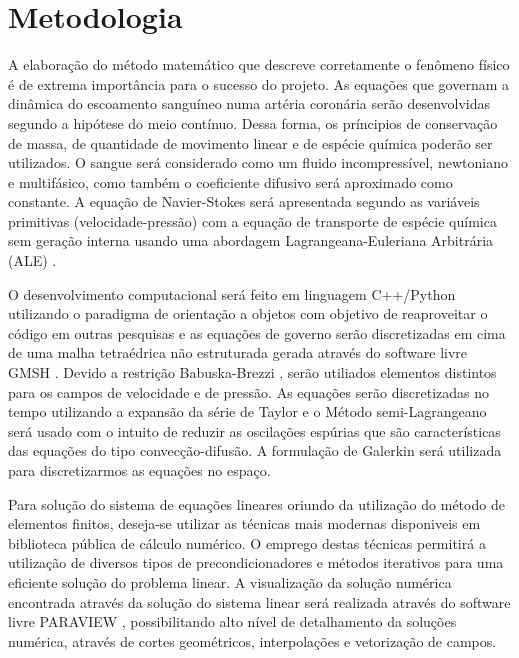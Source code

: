 \section{Metodologia}

A elaboração do método matemático que descreve corretamente o fenômeno físico é de extrema importância para o sucesso do projeto. 
As equações que governam a dinâmica do escoamento sanguíneo numa artéria coronária serão desenvolvidas segundo a hipótese do meio contínuo. 
Dessa forma, os príncipios de conservação de massa, de quantidade de movimento linear e de espécie química poderão ser utilizados. 
O sangue será considerado como um fluido incompressível, newtoniano e multifásico, 
como também o coeficiente difusivo será aproximado como constante. 
A equação de Navier-Stokes será apresentada segundo as variáveis primitivas (velocidade-pressão) com 
a equação de transporte de espécie química sem geração interna
usando uma abordagem Lagrangeana-Euleriana Arbitrária (ALE) \cite{donea}.

\medskip
O desenvolvimento computacional será feito em linguagem C++/Python \cite{c++} \cite{python} 
utilizando o paradigma de orientação a objetos com objetivo de reaproveitar o código em outras pesquisas e 
as equações de governo serão discretizadas em cima de uma malha tetraédrica não estruturada gerada através do software livre GMSH \cite{gmsh}. 
Devido a restrição Babuska-Brezzi \cite{babuska} \cite{brezzi}, serão utiliados elementos distintos para os campos de velocidade e de pressão. 
As equações serão discretizadas no tempo utilizando a expansão da série de Taylor e o Método semi-Lagrangeano \cite{pironneu} será usado com o intuito de reduzir as oscilações espúrias que são características das equações do tipo convecção-difusão.
A formulação de Galerkin \cite{galerkin} será utilizada para discretizarmos as equações no espaço. 

\medskip
Para solução do sistema de equações lineares oriundo da utilização do método de elementos finitos, 
deseja-se utilizar as técnicas mais modernas disponiveis em biblioteca pública de cálculo numérico. 
O emprego destas técnicas permitirá a utilização de diversos tipos de precondicionadores e 
métodos iterativos para uma eficiente solução do problema linear. 
A visualização da solução numérica encontrada através da solução do sistema linear será realizada através do software livre PARAVIEW \cite{paraview}, 
possibilitando alto nível de detalhamento da soluções numérica, através de cortes geométricos, interpolações e vetorização de campos.
